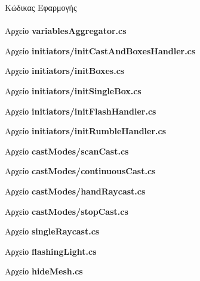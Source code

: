 
{\LARGE Κώδικας Εφαρμογής}
\\
\\

\lstset{style=sharpc}
{\large Αρχείο \textbf{variablesAggregator.cs}}\label{lst:variablesAggregator}


{\large Αρχείο \textbf{initiators/initCastAndBoxesHandler.cs}}\label{lst:initCastAndBoxesHandler}


{\large Αρχείο \textbf{initiators/initBoxes.cs}}\label{lst:initBoxes}


{\large Αρχείο \textbf{initiators/initSingleBox.cs}}\label{lst:initSingleBox}


{\large Αρχείο \textbf{initiators/initFlashHandler.cs}}\label{lst:initFlashHandler}


{\large Αρχείο \textbf{initiators/initRumbleHandler.cs}}\label{lst:initRumbleHandler}


{\large Αρχείο \textbf{castModes/scanCast.cs}}\label{lst:scanCast}


{\large Αρχείο \textbf{castModes/continuousCast.cs}}\label{lst:continuousCast}


{\large Αρχείο \textbf{castModes/handRaycast.cs}}\label{lst:handRaycast}


{\large Αρχείο \textbf{castModes/stopCast.cs}}\label{lst:stopCast}


{\large Αρχείο \textbf{singleRaycast.cs}}\label{lst:singleRaycast}


{\large Αρχείο \textbf{flashingLight.cs}}\label{lst:flashingLight}


{\large Αρχείο \textbf{hideMesh.cs}}\label{lst:hideMesh}
